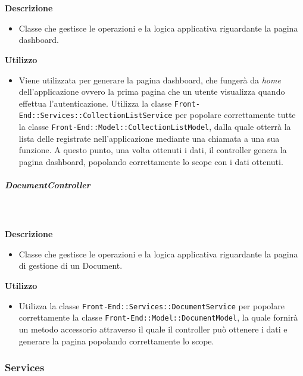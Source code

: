         \textbf{\\ \\ Descrizione} 
          \begin{itemize}
            \item[] Classe che gestisce le operazioni e la logica applicativa riguardante la pagina dashboard.
          \end{itemize}      
        \textbf{Utilizzo}  
          \begin{itemize}
            \item[] Viene utilizzata per generare la pagina dashboard, che fungerà da \textit{home} dell'applicazione ovvero la prima pagina che un utente visualizza quando effettua l'autenticazione. Utilizza la classe \texttt{Front-End::Services::CollectionListService} per popolare correttamente tutte la classe \texttt{Front-End::Model::CollectionListModel}, dalla quale otterrà la lista delle  registrate nell'applicazione mediante una chiamata a una sua funzione. A questo punto, una volta ottenuti i dati, il controller genera la pagina dashboard, popolando correttamente lo scope con i dati ottenuti.
          \end{itemize}
      \subparagraph{DocumentController}
        
        \textbf{\\ \\ Descrizione} 
          \begin{itemize}
            \item[] Classe che gestisce le operazioni e la logica applicativa riguardante la pagina di gestione di un Document.
          \end{itemize}      
        \textbf{Utilizzo}  
          \begin{itemize}
            \item[] Utilizza la classe \texttt{Front-End::Services::DocumentService} per popolare correttamente la classe \texttt{Front-End::Model::DocumentModel}, la quale fornirà un metodo accessorio attraverso il quale il controller può ottenere i dati e generare la pagina popolando correttamente lo scope.
          \end{itemize}
  \subsubsection{Services}
